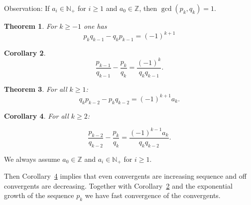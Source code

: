 \documentclass[a4paper,11pt,american]{article}
\theoremstyle{plain}
\newtheorem{theorem}{Theorem}
\newtheorem{corollary}[theorem]{Corollary}
\theoremstyle{definition}
\begin{document}
Observation: If $a_i ∈ℕ_+$ for $i≥1$ and $a_0 ∈ℤ$, then $\gcd(p_k,q_k) = 1$.


\begin{theorem}
  \label{thr:3}
  For $k≥ -1$ one has
  \begin{displaymath}
    p_k q_{k-1} - q_k p_{k-1} = (-1)^{k+1} 
  \end{displaymath}
\end{theorem}

\begin{corollary}
  \label{co:1}
  \begin{equation}
    \label{eq:4}
      \frac{p_{k-1}}{q_{k-1}} - \frac{p_k}{q_k} = \frac{(-1)^k }{q_k q_{k-1}}.    
  \end{equation}

\end{corollary}

\begin{theorem}
  For all $k≥1$:
  \begin{displaymath}
    q_k p_{k-2} - p_k q_{k-2} = (-1)^ {k+1} a_k. 
  \end{displaymath}
\end{theorem}


\begin{corollary}
  \label{co:2}
  For all $k≥ 2$:

  \begin{displaymath}
    \frac{p_{k-2}}{q_{k-2}} -    \frac{p_k}{q_k} = \frac{(-1)^{k-1} a_k}{q_k q_{k-2}}. 
  \end{displaymath}
\end{corollary}

We always assume $a_0∈ℤ$ and $a_i ∈ ℕ_+$ for $i≥1$.

Then Corollary~\ref{co:2} implies that even convergents are increasing sequence and off convergents are decreasing. Together with Corollary~\ref{co:1} and the exponential growth of the sequence $p_k$ we have fast convergence of the convergents.  



\end{document}
